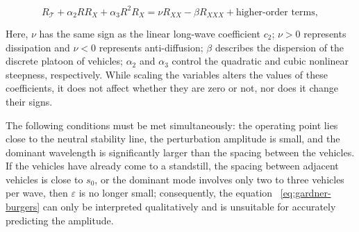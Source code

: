 \documentclass[11pt,a4paper,openany]{book}
\numberwithin{equation}{chapter}
\numberwithin{figure}{chapter}
\numberwithin{table}{chapter}
\begin{document}
\begin{tcolorbox}[keybox,title=\textbf{The normalized form of the weakly nonlinear long waves of the original IDM}]
\begin{equation}
R_{\mathcal T}
+\alpha_2 R R_X
+\alpha_3 R^2R_X
=\nu R_{XX}-\beta R_{XXX}+\text{higher-order terms},
\label{eq:gardner-burgers}
\end{equation}
\end{tcolorbox}









Here, $\nu$ has the same sign as the linear long-wave coefficient $c_2$; $\nu>0$ represents dissipation and $\nu<0$ represents anti-diffusion; $\beta$ describes the dispersion of the discrete platoon of vehicles; $\alpha_2$ and $\alpha_3$ control the quadratic and cubic nonlinear steepness, respectively. While scaling the variables alters the values ​​of these coefficients, it does not affect whether they are zero or not, nor does it change their signs.












\begin{tcolorbox}[notebox,title=\textbf{Three conditions for the validity of the reduction}]

The following conditions must be met simultaneously: the operating point lies close to the neutral stability line, the perturbation amplitude is small, and the dominant wavelength is significantly larger than the spacing between the vehicles. If the vehicles have already come to a standstill, the spacing between adjacent vehicles is close to $s_0$, or the dominant mode involves only two to three vehicles per wave, then $\varepsilon$ is no longer small; consequently, the equation ~\eqref{eq:gardner-burgers} can only be interpreted qualitatively and is unsuitable for accurately predicting the amplitude.









\end{tcolorbox}
\end{document}
